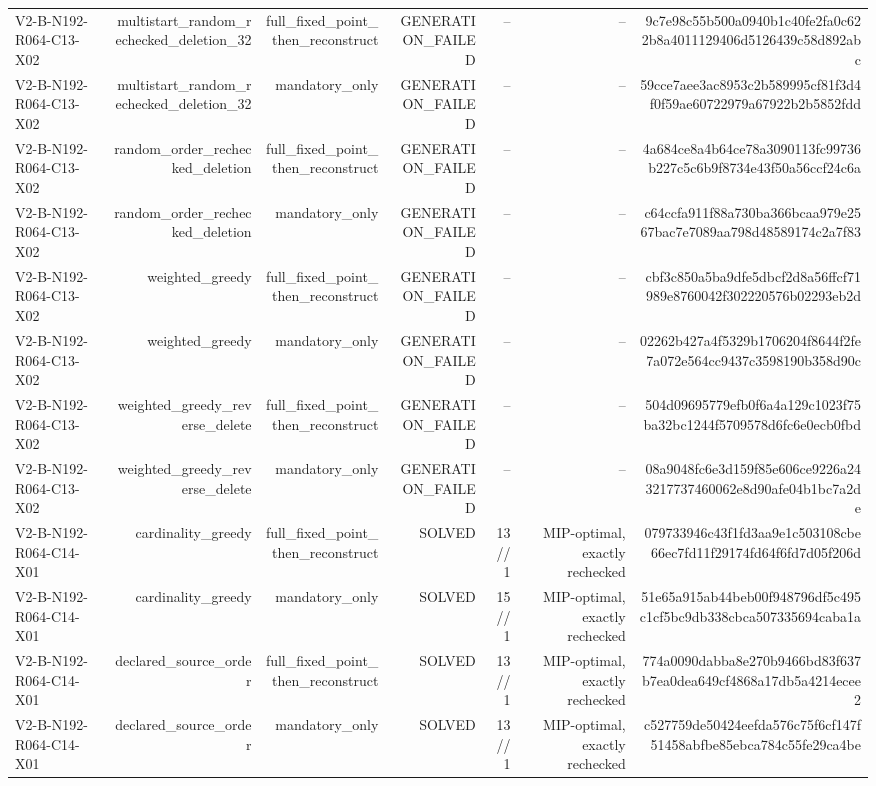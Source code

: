 {\begin{longtable}{lrrrrrr}
V2-B-N192-R064-C13-X02 & multistart\_random\_rechecked\_deletion\_32 & full\_fixed\_point\_then\_reconstruct & GENERATION\_FAILED & -- & -- & 9c7e98c55b500a0940b1c40fe2fa0c622b8a4011129406d5126439c58d892abc \\
V2-B-N192-R064-C13-X02 & multistart\_random\_rechecked\_deletion\_32 & mandatory\_only & GENERATION\_FAILED & -- & -- & 59cce7aee3ac8953c2b589995cf81f3d4f0f59ae60722979a67922b2b5852fdd \\
V2-B-N192-R064-C13-X02 & random\_order\_rechecked\_deletion & full\_fixed\_point\_then\_reconstruct & GENERATION\_FAILED & -- & -- & 4a684ce8a4b64ce78a3090113fc99736b227c5c6b9f8734e43f50a56ccf24c6a \\
V2-B-N192-R064-C13-X02 & random\_order\_rechecked\_deletion & mandatory\_only & GENERATION\_FAILED & -- & -- & c64ccfa911f88a730ba366bcaa979e2567bac7e7089aa798d48589174c2a7f83 \\
V2-B-N192-R064-C13-X02 & weighted\_greedy & full\_fixed\_point\_then\_reconstruct & GENERATION\_FAILED & -- & -- & cbf3c850a5ba9dfe5dbcf2d8a56ffcf71989e8760042f302220576b02293eb2d \\
V2-B-N192-R064-C13-X02 & weighted\_greedy & mandatory\_only & GENERATION\_FAILED & -- & -- & 02262b427a4f5329b1706204f8644f2fe7a072e564cc9437c3598190b358d90c \\
V2-B-N192-R064-C13-X02 & weighted\_greedy\_reverse\_delete & full\_fixed\_point\_then\_reconstruct & GENERATION\_FAILED & -- & -- & 504d09695779efb0f6a4a129c1023f75ba32bc1244f5709578d6fc6e0ecb0fbd \\
V2-B-N192-R064-C13-X02 & weighted\_greedy\_reverse\_delete & mandatory\_only & GENERATION\_FAILED & -- & -- & 08a9048fc6e3d159f85e606ce9226a243217737460062e8d90afe04b1bc7a2de \\
V2-B-N192-R064-C14-X01 & cardinality\_greedy & full\_fixed\_point\_then\_reconstruct & SOLVED & 13//1 & MIP-optimal, exactly rechecked & 079733946c43f1fd3aa9e1c503108cbe66ec7fd11f29174fd64f6fd7d05f206d \\
V2-B-N192-R064-C14-X01 & cardinality\_greedy & mandatory\_only & SOLVED & 15//1 & MIP-optimal, exactly rechecked & 51e65a915ab44beb00f948796df5c495c1cf5bc9db338cbca507335694caba1a \\
V2-B-N192-R064-C14-X01 & declared\_source\_order & full\_fixed\_point\_then\_reconstruct & SOLVED & 13//1 & MIP-optimal, exactly rechecked & 774a0090dabba8e270b9466bd83f637b7ea0dea649cf4868a17db5a4214ecee2 \\
V2-B-N192-R064-C14-X01 & declared\_source\_order & mandatory\_only & SOLVED & 13//1 & MIP-optimal, exactly rechecked & c527759de50424eefda576c75f6cf147f51458abfbe85ebca784c55fe29ca4be \\

\end{longtable}}
